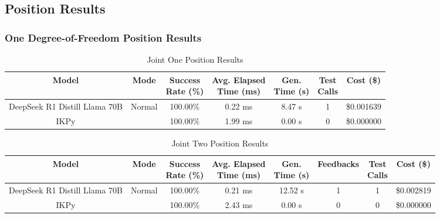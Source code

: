 \subsection{Position Results}

\subsubsection{One Degree-of-Freedom Position Results}

\begin{table}[H]
\tiny
\renewcommand{\arraystretch}{1.2}
\caption{Joint One Position Results}
\begin{center}
\begin{tabular}{|c|c|c|c|c|c|c|}
    \hline
    \textbf{Model} & 
    \textbf{Mode} & 
    \makecell{\textbf{Success}\\\textbf{Rate (\%)}} &
    \makecell{\textbf{Avg. Elapsed}\\\textbf{Time (ms)}} &
    \makecell{\textbf{Gen.}\\\textbf{Time (s)}} &
    \makecell{\textbf{Test}\\\textbf{Calls}} &
    \textbf{Cost (\$)} \\
    \hline
    DeepSeek R1 Distill Llama 70B & Normal & 100.00\% & 0.22 ms & 8.47 s & 1 & \$0.001639 \\
    \hline
    IKPy &  & 100.00\% & 1.99 ms & 0.00 s & 0 & \$0.000000 \\
    \hline
\end{tabular}
\label{Results-Position-1-1}
\end{center}
\end{table}

\begin{table}[H]
\tiny
\renewcommand{\arraystretch}{1.2}
\caption{Joint Two Position Results}
\begin{center}
\begin{tabular}{|c|c|c|c|c|c|c|c|}
    \hline
    \textbf{Model} & 
    \textbf{Mode} & 
    \makecell{\textbf{Success}\\\textbf{Rate (\%)}} &
    \makecell{\textbf{Avg. Elapsed}\\\textbf{Time (ms)}} &
    \makecell{\textbf{Gen.}\\\textbf{Time (s)}} &
    \textbf{Feedbacks} &
    \makecell{\textbf{Test}\\\textbf{Calls}} &
    \textbf{Cost (\$)} \\
    \hline
    DeepSeek R1 Distill Llama 70B & Normal & 100.00\% & 0.21 ms & 12.52 s & 1 & 1 & \$0.002819 \\
    \hline
    IKPy &  & 100.00\% & 2.43 ms & 0.00 s & 0 & 0 & \$0.000000 \\
    \hline
\end{tabular}
\label{Results-Position-2-2}
\end{center}
\end{table}

